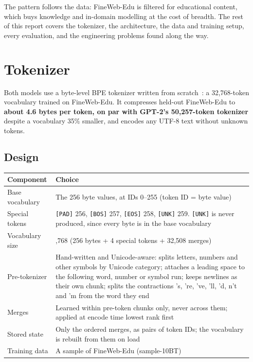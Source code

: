 \documentclass[11pt]{article}
\begin{document}
The pattern follows the data: FineWeb-Edu is filtered for educational content, which buys knowledge and in-domain modelling at the cost of breadth. The rest of this report covers the tokenizer, the architecture, the data and training setup, every evaluation, and the engineering problems found along the way.

\section{Tokenizer}

Both models use a byte-level BPE tokenizer written from scratch~\citep{sennrich2016bpe,radford2019gpt2}: a 32,768-token vocabulary trained on FineWeb-Edu. It compresses held-out FineWeb-Edu to \textbf{about 4.6 bytes per token, on par with GPT-2's 50,257-token tokenizer} despite a vocabulary 35\% smaller, and encodes any UTF-8 text without unknown tokens.

\subsection{Design}

\begin{center}
\small
\begin{tabularx}{\linewidth}{l>{\raggedright\arraybackslash}X}
\toprule
\textbf{Component} & \textbf{Choice} \\
\midrule
Base vocabulary & The 256 byte values, at IDs 0–255 (token ID = byte value) \\
Special tokens & \texttt{[PAD]} 256, \texttt{[BOS]} 257, \texttt{[EOS]} 258, \texttt{[UNK]} 259. \texttt{[UNK]} is never produced, since every byte is in the base vocabulary \\
Vocabulary size & 32,768 (256 bytes + 4 special tokens + 32,508 merges) \\
Pre-tokenizer & Hand-written and Unicode-aware: splits letters, numbers and other symbols by Unicode category; attaches a leading space to the following word, number or symbol run; keeps newlines as their own chunk; splits the contractions 's, 're, 've, 'll, 'd, n't and 'm from the word they end \\
Merges & Learned within pre-token chunks only, never across them; applied at encode time lowest rank first \\
Stored state & Only the ordered merges, as pairs of token IDs; the vocabulary is rebuilt from them on load \\
Training data & A sample of FineWeb-Edu (sample-10BT) \\
\bottomrule
\end{tabularx}
\end{center}
\end{document}
